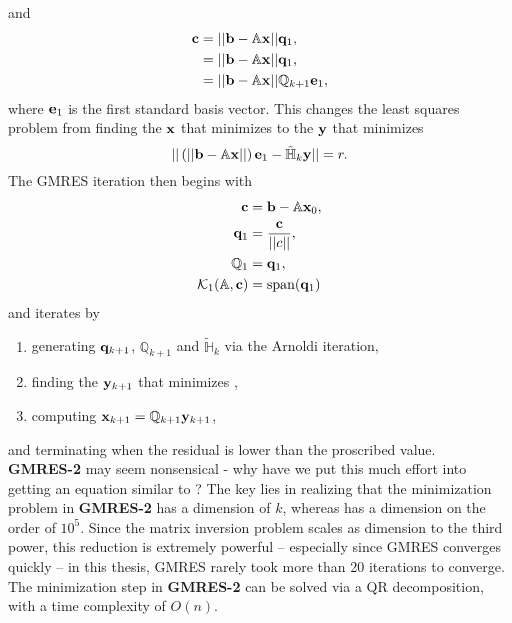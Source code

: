 and
\begin{align} 
\begin{split}
\mathbf{c} &= ||\mathbf{b} - \mathbb{A}\mathbf{x}||\mathbf{q}_1, \\
	&= ||\mathbf{b} - \mathbb{A}\mathbf{x}||\mathbf{q}_1,\\
	&= ||\mathbf{b} - \mathbb{A}\mathbf{x}||\mathbb{Q}_{k+1}\mathbf{e}_1,
\end{split}
\end{align}
where $\mathbf{e}_1$ is the first standard basis vector. This changes the least squares problem from finding the $\mathbf{x}$ that minimizes  to the $\mathbf{y}$ that minimizes
\begin{equation}\label{eq:GMRESMIN}
|| \left ( ||\mathbf{b} - \mathbb{A}\mathbf{x}|| \right )\mathbf{e}_1 - \mathbb{\tilde{H}}_k \mathbf{y} || = r.
\end{equation}
 The GMRES iteration then begins with 
 \begin{align*}
 \mathbf{c} &= \mathbf{b} - \mathbb{A}\mathbf{x}_0,\\
  \mathbf{q}_1 &= \dfrac{\mathbf{c}}{||c||}, \\
  \mathbb{Q}_1 &= \mathbf{q}_1,\\
  \mathcal{K}_1(\mathbb{A},\mathbf{c}) &= \mathrm{span}(\mathbf{q}_1)
  \end{align*} 
  and iterates by
  \begin{enumerate}
  \renewcommand{\labelenumi}{\textbf{\theenumi}}
\renewcommand{\theenumi}{GMRES-\arabic{enumi})}
  \item generating $\mathbf{q}_{k+1}$, $\mathbb{Q}_{k+1}$ and $\mathbb{\tilde{H}}_k$ via the Arnoldi iteration,
  \item finding the $\mathbf{y}_{k+1}$ that minimizes ,
  \item computing $\mathbf{x}_{k+1} = \mathbb{Q}_{k+1}\mathbf{y}_{k+1}$,
  \end{enumerate}
  and terminating when the residual is lower than the proscribed value. \\

 {\bf GMRES-2} may seem nonsensical - why have we put this much effort into getting an equation similar to ? The key lies in realizing that the minimization problem in  {\bf GMRES-2} has a dimension of $k$, whereas  has a dimension on the order of $10^5$. Since the matrix inversion problem scales as dimension to the third power, this reduction is extremely powerful -- especially since GMRES converges quickly -- in this thesis, GMRES rarely took more than 20 iterations to converge. The minimization step in  {\bf GMRES-2} can be solved via a QR decomposition, with a time complexity of $O(n)$.  
 
